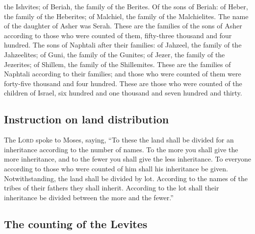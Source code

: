 the Ishvites; of Beriah, the family of the Berites.  Of
the sons of Beriah: of Heber, the family of the Heberites; of Malchiel,
the family of the Malchielites.  The name of the daughter
of Asher was Serah.  These are the families of the sons
of Asher according to those who were counted of them, fifty-three
thousand and four hundred.  The sons of Naphtali after
their families: of Jahzeel, the family of the Jahzeelites; of Guni, the
family of the Gunites;  of Jezer, the family of the
Jezerites; of Shillem, the family of the Shillemites. 
These are the families of Naphtali according to their families; and
those who were counted of them were forty-five thousand and four
hundred.  These are those who were counted of the
children of Israel, six hundred and one thousand and seven hundred and
thirty.

\hypertarget{instruction-on-land-distribution}{%
\subsection{Instruction on land
distribution}\label{instruction-on-land-distribution}}

 The \textsc{Lord} spoke to Moses, saying,
 ``To these the land shall be divided for an inheritance
according to the number of names.  To the more you shall
give the more inheritance, and to the fewer you shall give the less
inheritance. To everyone according to those who were counted of him
shall his inheritance be given.  Notwithstanding, the
land shall be divided by lot. According to the names of the tribes of
their fathers they shall inherit.  According to the lot
shall their inheritance be divided between the more and the fewer.''

\hypertarget{the-counting-of-the-levites}{%
\subsection{The counting of the
Levites}\label{the-counting-of-the-levites}}

